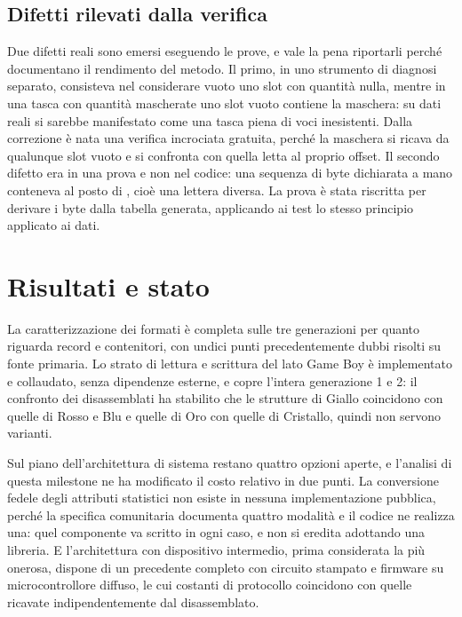 \documentclass[11pt,a4paper]{article}
\begin{document}
\subsection{Difetti rilevati dalla verifica}

Due difetti reali sono emersi eseguendo le prove, e vale la pena riportarli perché documentano il rendimento del metodo. Il primo, in uno strumento di diagnosi separato, consisteva nel considerare vuoto uno slot con quantità nulla, mentre in una tasca con quantità mascherate uno slot vuoto contiene la maschera: su dati reali si sarebbe manifestato come una tasca piena di voci inesistenti. Dalla correzione è nata una verifica incrociata gratuita, perché la maschera si ricava da qualunque slot vuoto e si confronta con quella letta al proprio offset. Il secondo difetto era in una prova e non nel codice: una sequenza di byte dichiarata a mano conteneva  al posto di , cioè una lettera diversa. La prova è stata riscritta per derivare i byte dalla tabella generata, applicando ai test lo stesso principio applicato ai dati.

\section{Risultati e stato}

La caratterizzazione dei formati è completa sulle tre generazioni per quanto riguarda record e contenitori, con undici punti precedentemente dubbi risolti su fonte primaria. Lo strato di lettura e scrittura del lato Game Boy è implementato e collaudato, senza dipendenze esterne, e copre l'intera generazione 1 e 2: il confronto dei disassemblati ha stabilito che le strutture di Giallo coincidono con quelle di Rosso e Blu e quelle di Oro con quelle di Cristallo, quindi non servono varianti.

Sul piano dell'architettura di sistema restano quattro opzioni aperte, e l'analisi di questa milestone ne ha modificato il costo relativo in due punti. La conversione fedele degli attributi statistici non esiste in nessuna implementazione pubblica, perché la specifica comunitaria documenta quattro modalità e il codice ne realizza una: quel componente va scritto in ogni caso, e non si eredita adottando una libreria. E l'architettura con dispositivo intermedio, prima considerata la più onerosa, dispone di un precedente completo con circuito stampato e firmware su microcontrollore diffuso, le cui costanti di protocollo coincidono con quelle ricavate indipendentemente dal disassemblato.
\end{document}
